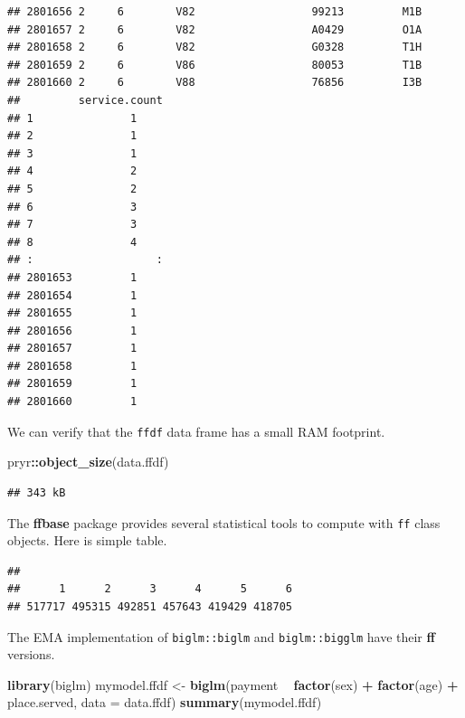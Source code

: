 \documentclass[]{book}
\newenvironment{Shaded}{\begin{snugshade}}{\end{snugshade}}
\newcommand{\KeywordTok}[1]{\textcolor[rgb]{0.13,0.29,0.53}{\textbf{#1}}}
\newcommand{\DataTypeTok}[1]{\textcolor[rgb]{0.13,0.29,0.53}{#1}}
\newcommand{\StringTok}[1]{\textcolor[rgb]{0.31,0.60,0.02}{#1}}
\newcommand{\OperatorTok}[1]{\textcolor[rgb]{0.81,0.36,0.00}{\textbf{#1}}}
\newcommand{\NormalTok}[1]{#1}
\theoremstyle{definition}
\theoremstyle{definition}
\theoremstyle{definition}
\theoremstyle{remark}
\begin{document}
\begin{verbatim}
## 2801656 2     6        V82                  99213         M1B  
## 2801657 2     6        V82                  A0429         O1A  
## 2801658 2     6        V82                  G0328         T1H  
## 2801659 2     6        V86                  80053         T1B  
## 2801660 2     6        V88                  76856         I3B  
##         service.count
## 1               1    
## 2               1    
## 3               1    
## 4               2    
## 5               2    
## 6               3    
## 7               3    
## 8               4    
## :                   :
## 2801653         1    
## 2801654         1    
## 2801655         1    
## 2801656         1    
## 2801657         1    
## 2801658         1    
## 2801659         1    
## 2801660         1
\end{verbatim}

We can verify that the \texttt{ffdf} data frame has a small RAM
footprint.

\begin{Shaded}
\begin{Highlighting}[]
\NormalTok{pryr}\OperatorTok{::}\KeywordTok{object_size}\NormalTok{(data.ffdf)}
\end{Highlighting}
\end{Shaded}

\begin{verbatim}
## 343 kB
\end{verbatim}

The \textbf{ffbase} package provides several statistical tools to
compute with \texttt{ff} class objects. Here is simple table.

\begin{Shaded}
\end{Shaded}

\begin{verbatim}
## 
##      1      2      3      4      5      6 
## 517717 495315 492851 457643 419429 418705
\end{verbatim}

The EMA implementation of \texttt{biglm::biglm} and
\texttt{biglm::bigglm} have their \textbf{ff} versions.

\begin{Shaded}
\begin{Highlighting}[]
\KeywordTok{library}\NormalTok{(biglm)}
\NormalTok{mymodel.ffdf <-}\StringTok{ }\KeywordTok{biglm}\NormalTok{(payment }\OperatorTok{~}\StringTok{ }\KeywordTok{factor}\NormalTok{(sex) }\OperatorTok{+}\StringTok{ }\KeywordTok{factor}\NormalTok{(age) }\OperatorTok{+}\StringTok{ }\NormalTok{place.served, }
                              \DataTypeTok{data =}\NormalTok{ data.ffdf)}
\KeywordTok{summary}\NormalTok{(mymodel.ffdf)}
\end{Highlighting}
\end{Shaded}
\end{document}
